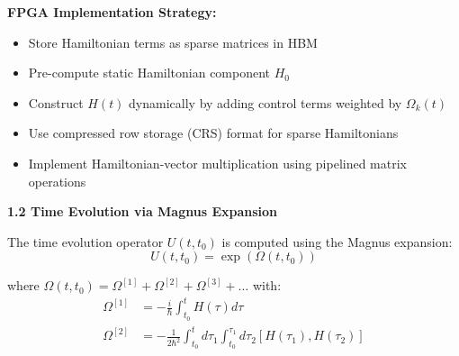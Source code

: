 \documentclass[12pt,a4paper]{article}
\begin{document}
\textbf{FPGA Implementation Strategy:}
\begin{itemize}[noitemsep]
\item Store Hamiltonian terms as sparse matrices in HBM
\item Pre-compute static Hamiltonian component $H_0$
\item Construct $H(t)$ dynamically by adding control terms weighted by $\Omega_k(t)$
\item Use compressed row storage (CRS) format for sparse Hamiltonians
\item Implement Hamiltonian-vector multiplication using pipelined matrix operations
\end{itemize}

\textbf{1.2 Time Evolution via Magnus Expansion}

The time evolution operator $U(t, t_0)$ is computed using the Magnus expansion:
\begin{equation}
U(t, t_0) = \exp\left(\Omega(t, t_0)\right)
\end{equation}

where $\Omega(t, t_0) = \Omega^{[1]} + \Omega^{[2]} + \Omega^{[3]} + \ldots$ with:
\begin{align}
\Omega^{[1]} &= -\frac{i}{\hbar} \int_{t_0}^t H(\tau) d\tau \\
\Omega^{[2]} &= -\frac{1}{2\hbar^2} \int_{t_0}^t d\tau_1 \int_{t_0}^{\tau_1} d\tau_2 [H(\tau_1), H(\tau_2)]
\end{align}
\end{document}
